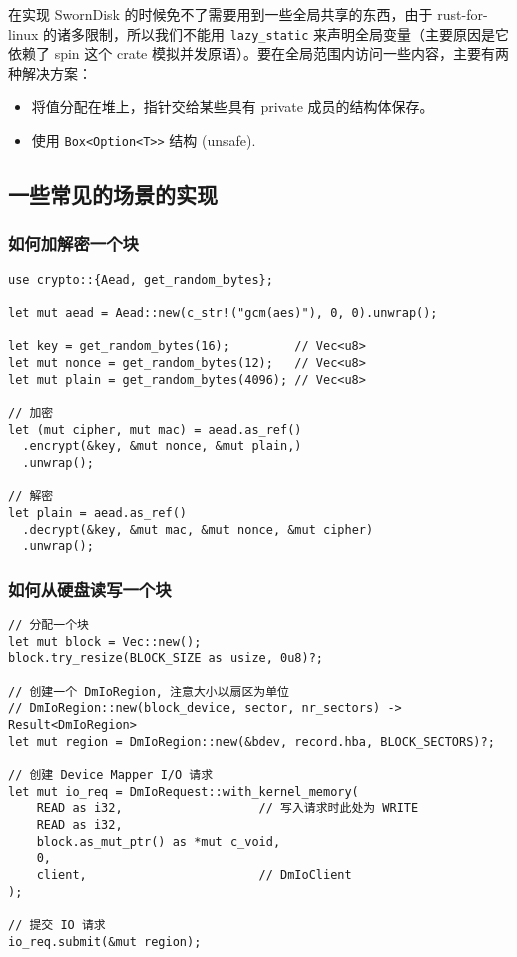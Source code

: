 在实现 SwornDisk 的时候免不了需要用到一些全局共享的东西，由于 rust-for-linux 的诸多限制，所以我们不能用 \texttt{lazy_static} 来声明全局变量（主要原因是它依赖了 spin 这个 crate 模拟并发原语）。要在全局范围内访问一些内容，主要有两种解决方案：

\begin{itemize}[itemsep=2pt,topsep=0pt,parsep=0pt]
  \item 将值分配在堆上，指针交给某些具有 private 成员的结构体保存。
  \item 使用 \texttt{Box<Option<T>>} 结构 (unsafe).
\end{itemize}

\clearpage
\subsection{一些常见的场景的实现}

\subsubsection{如何加解密一个块}

\begin{verbatim}
use crypto::{Aead, get_random_bytes};

let mut aead = Aead::new(c_str!("gcm(aes)"), 0, 0).unwrap();

let key = get_random_bytes(16);         // Vec<u8>
let mut nonce = get_random_bytes(12);   // Vec<u8>
let mut plain = get_random_bytes(4096); // Vec<u8>

// 加密
let (mut cipher, mut mac) = aead.as_ref()
  .encrypt(&key, &mut nonce, &mut plain,)
  .unwrap();

// 解密
let plain = aead.as_ref()
  .decrypt(&key, &mut mac, &mut nonce, &mut cipher)
  .unwrap();
\end{verbatim}

\subsubsection{如何从硬盘读写一个块}

\begin{verbatim}
// 分配一个块
let mut block = Vec::new();
block.try_resize(BLOCK_SIZE as usize, 0u8)?;

// 创建一个 DmIoRegion, 注意大小以扇区为单位
// DmIoRegion::new(block_device, sector, nr_sectors) -> Result<DmIoRegion>
let mut region = DmIoRegion::new(&bdev, record.hba, BLOCK_SECTORS)?;

// 创建 Device Mapper I/O 请求
let mut io_req = DmIoRequest::with_kernel_memory(
    READ as i32,                   // 写入请求时此处为 WRITE
    READ as i32,
    block.as_mut_ptr() as *mut c_void,
    0,
    client,                        // DmIoClient
);

// 提交 IO 请求
io_req.submit(&mut region);
\end{verbatim}

